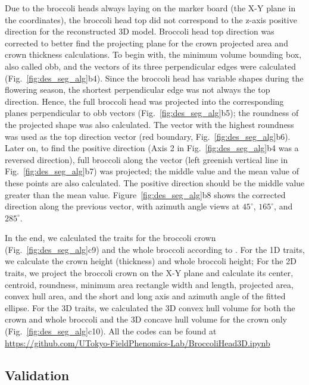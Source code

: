 Due to the broccoli heads always laying on the marker board (the X-Y plane in the coordinates), the broccoli head top did not correspond to the z-axis positive direction for the reconstructed 3D model. Broccoli head top direction was corrected to better find the projecting plane for the crown projected area and crown thickness calculations. To begin with, the minimum volume bounding box, also called \gls{obb}, and the vectors of its three perpendicular edges were calculated (Fig.~\ref{fig:des_seg_alg}b4). Since the broccoli head has variable shapes during the flowering season, the shortest perpendicular edge was not always the top direction. Hence, the full broccoli head was projected into the corresponding planes perpendicular to \gls{obb} vectors (Fig.~\ref{fig:des_seg_alg}b5); the roundness of the projected shape was also calculated. The vector with the highest roundness was used as the top direction vector (red boundary, Fig.~\ref{fig:des_seg_alg}b6). Later on, to find the positive direction (Axis 2 in Fig.~\ref{fig:des_seg_alg}b4 was a reversed direction), full broccoli along the vector (left greenish vertical line in Fig.~\ref{fig:des_seg_alg}b7) was projected; the middle value and the mean value of these points are also calculated. The positive direction should be the middle value greater than the mean value. Figure~\ref{fig:des_seg_alg}b8 shows the corrected direction along the previous vector, with azimuth angle views at $45^\circ$, $165^\circ$, and $285^\circ$.

In the end, we calculated the traits for the broccoli crown (Fig.~\ref{fig:des_seg_alg}c9) and the whole broccoli according to \citet{feldman_easydcp_2021}. For the 1D traits, we calculate the crown height (thickness) and whole broccoli height; For the 2D traits, we project the broccoli crown on the X-Y plane and calculate its center, centroid, roundness, minimum area rectangle width and length, projected area, convex hull area, and the short and long axis and azimuth angle of the fitted ellipse. For the 3D traits, we calculated the 3D convex hull volume for both the crown and whole broccoli and the 3D concave hull volume for the crown only (Fig.~\ref{fig:des_seg_alg}c10). All the codes can be found at \url{https://github.com/UTokyo-FieldPhenomics-Lab/BroccoliHead3D.ipynb} %


\subsection{Validation}

